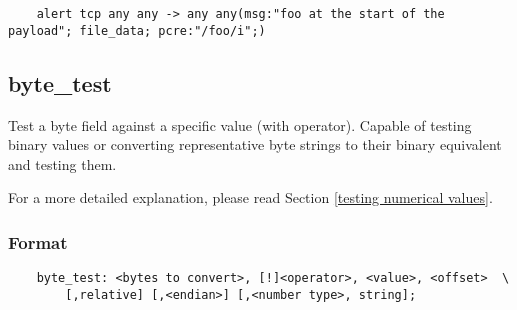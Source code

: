 \documentclass[english]{report}
\begin{document}
\begin{verbatim}
	alert tcp any any -> any any(msg:"foo at the start of the payload"; file_data; pcre:"/foo/i";)
\end{verbatim}

\subsection{byte\_test}
\label{sub:byte_test}

Test a byte field against a specific value (with operator).  Capable of testing
binary values or converting representative byte strings to their binary
equivalent and testing them.

For a more detailed explanation, please read Section \ref{testing numerical
values}.

\subsubsection{Format}

\begin{verbatim}
    byte_test: <bytes to convert>, [!]<operator>, <value>, <offset>  \
        [,relative] [,<endian>] [,<number type>, string];
\end{verbatim}
\end{document}
